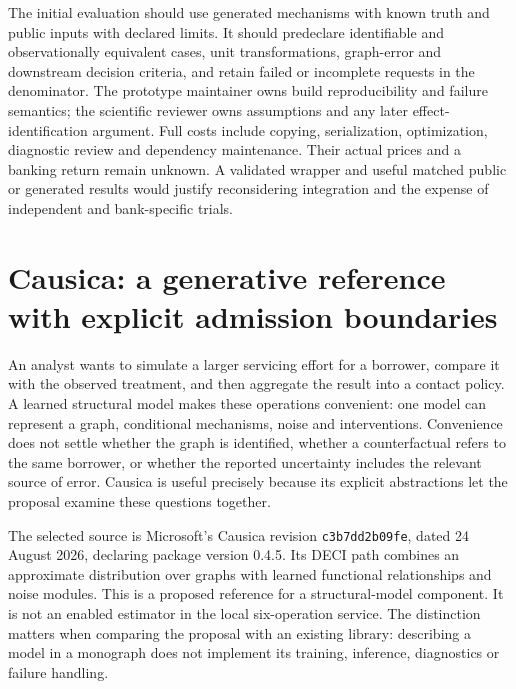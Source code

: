 The initial evaluation should use generated mechanisms with known truth and
public inputs with declared limits. It should predeclare identifiable and
observationally equivalent cases, unit transformations, graph-error and
downstream decision criteria, and retain failed or incomplete requests in
the denominator. The prototype maintainer owns build reproducibility and
failure semantics; the scientific reviewer owns assumptions and any later
effect-identification argument. Full costs include copying, serialization,
optimization, diagnostic review and dependency maintenance. Their actual
prices and a banking return remain unknown. A validated wrapper and useful
matched public or generated results would justify reconsidering integration
and the expense of independent and bank-specific trials.
\citep{exec16_dagma_primary,exec16_dagma_runtime,exec16_dagma_exact}
\label{exec16:dagma-reuse-end}


\section{Causica: a generative reference with explicit admission boundaries}
\label{exec14:causica-contract}

An analyst wants to simulate a larger servicing effort for a borrower, compare
it with the observed treatment, and then aggregate the result into a contact
policy. A learned structural model makes these operations convenient: one
model can represent a graph, conditional mechanisms, noise and interventions.
Convenience does not settle whether the graph is identified, whether a
counterfactual refers to the same borrower, or whether the reported uncertainty
includes the relevant source of error. Causica is useful precisely because
its explicit abstractions let the proposal examine these questions together.

The selected source is Microsoft's Causica revision \texttt{c3b7dd2b09fe},
dated 24 August 2026, declaring package version 0.4.5. Its DECI path combines
an approximate distribution over graphs with learned functional relationships
and noise modules. This is a proposed reference for a structural-model
component. It is not an enabled estimator in the local six-operation service.
The distinction matters when comparing the proposal with an existing library:
describing a model in a monograph does not implement its training, inference,
diagnostics or failure handling. \citep{exec14_causica_primary,exec14_causica_decision}

